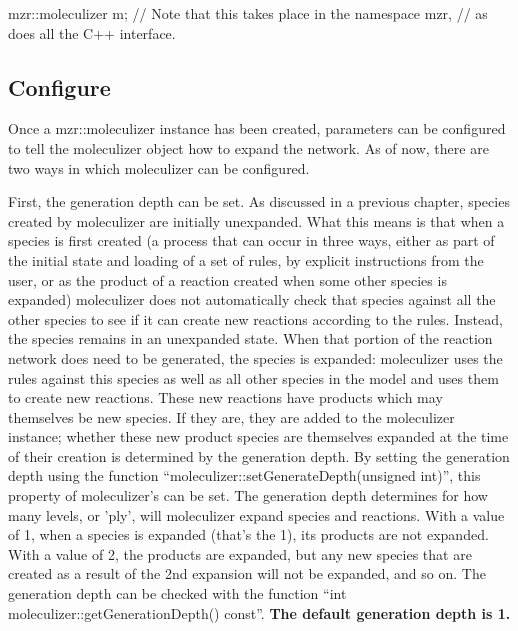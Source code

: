 \begin{LocalCPP}[caption=Creating a moleculizer object, label=creatingmzrexample]
mzr::moleculizer m; // Note that this takes place in the namespace mzr,
                    // as does all the C++ interface.
\end{LocalCPP}

\subsection{Configure}
Once a mzr::moleculizer instance has been created, parameters can be
configured to tell the moleculizer object how to expand the network.
As of now, there are two ways in which moleculizer can be configured.  

First, the generation depth can be set.  As discussed in a previous
chapter, species created by moleculizer are initially unexpanded.
What this means is that when a species is first created (a process
that can occur in three ways, either as part of the initial state and
loading of a set of rules, by explicit instructions from the user, or
as the product of a reaction created when some other species is
expanded) moleculizer does not automatically check that species
against all the other species to see if it can create new reactions
according to the rules.  Instead, the species remains in an unexpanded
state.  When that portion of the reaction network does need to be
generated, the species is expanded: moleculizer uses the rules against
this species as well as all other species in the model and uses them
to create new reactions.  These new reactions have products which may
themselves be new species.  If they are, they are added to the
moleculizer instance; whether these new product species are themselves
expanded at the time of their creation is determined by the generation
depth.  By setting the generation depth using the function
``moleculizer::setGenerateDepth(unsigned int)'', this property of
moleculizer's can be set.  The generation depth determines for how many
levels, or 'ply', will moleculizer expand species and reactions.  With
a value of 1, when a species is expanded (that's the 1), its products
are not expanded.  With a value of 2, the products are expanded, but
any new species that are created as a result of the 2nd expansion will
not be expanded, and so on.  The generation depth can be checked with
the function ``int moleculizer::getGenerationDepth() const''.  \bf{The
  default generation depth is 1.}

